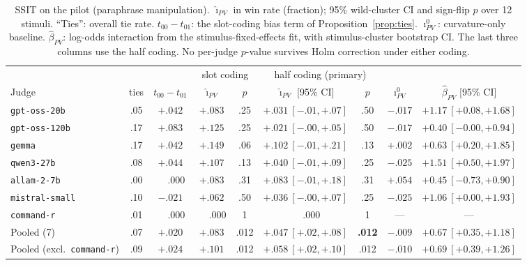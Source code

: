 \documentclass[10pt]{article}
\theoremstyle{remark}
\newcommand{\iPV}{\imath_{PV}}
\newcommand{\hiPV}{\hat\imath_{PV}}
\begin{document}
\begin{table}[t]
\centering
\caption{SSIT on the pilot (paraphrase manipulation). $\hiPV$ in win
rate (fraction); 95\% wild-cluster CI and sign-flip $p$ over 12
stimuli. ``Ties'': overall tie rate. $t_{00}{-}t_{01}$: the slot-coding
bias term of Proposition~\ref{prop:ties}. $\iPV^0$: curvature-only
baseline. $\hat\beta_{PV}$: log-odds interaction from the
stimulus-fixed-effects fit, with stimulus-cluster bootstrap CI. The last
three columns use the half coding. No per-judge $p$-value survives
Holm correction under either coding.}
\label{tab:pilot}
\small
\setlength{\tabcolsep}{4pt}
\begin{tabular}{lcc cc cc cc}
\toprule
& & & \multicolumn{2}{c}{slot coding} & \multicolumn{2}{c}{half coding (primary)} & & \\
\cmidrule(lr){4-5}\cmidrule(lr){6-7}
Judge & ties & $t_{00}{-}t_{01}$ & $\hiPV$ & $p$ & $\hiPV$ [95\% CI] & $p$ & $\iPV^0$ & $\hat\beta_{PV}$ [95\% CI]\\
\midrule
\texttt{gpt-oss-20b}   & .05 & $+.042$ & $+.083$ & .25 & $+.031\ [-.01,+.07]$ & .50 & $-.017$ & $+1.17\ [+0.08,+1.68]$\\
\texttt{gpt-oss-120b}  & .17 & $+.083$ & $+.125$ & .25 & $+.021\ [-.00,+.05]$ & .50 & $-.017$ & $+0.40\ [-0.00,+0.94]$\\
\texttt{gemma}         & .17 & $+.042$ & $+.149$ & .06 & $+.102\ [-.01,+.21]$ & .13 & $+.002$ & $+0.63\ [+0.20,+1.85]$\\
\texttt{qwen3-27b}     & .08 & $+.044$ & $+.107$ & .13 & $+.040\ [-.01,+.09]$ & .25 & $-.025$ & $+1.51\ [+0.50,+1.97]$\\
\texttt{allam-2-7b}    & .00 & $\phantom{+}.000$ & $+.083$ & .31 & $+.083\ [-.01,+.18]$ & .31 & $+.054$ & $+0.45\ [-0.73,+0.90]$\\
\texttt{mistral-small} & .10 & $-.021$ & $+.062$ & .50 & $+.036\ [-.00,+.07]$ & .25 & $-.025$ & $+1.06\ [+0.00,+1.93]$\\
\texttt{command-r}     & .01 & $\phantom{+}.000$ & $\phantom{+}.000$ & 1 & $\phantom{+}.000$ & 1 & --- & ---\\
\midrule
Pooled (7)             & .07 & $+.020$ & $+.083$ & .012 & $\mathbf{+.047\ [+.02,+.08]}$ & \textbf{.012} & $-.009$ & $\mathbf{+0.67\ [+0.35,+1.18]}$\\
Pooled (excl.\ \texttt{command-r}) & .09 & $+.024$ & $+.101$ & .012 & $+.058\ [+.02,+.10]$ & .012 & $-.010$ & $+0.69\ [+0.39,+1.26]$\\
\bottomrule
\end{tabular}
\end{table}
\end{document}
